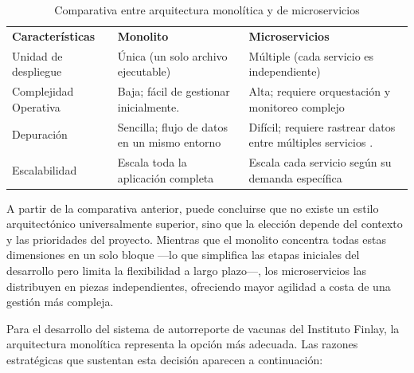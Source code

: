 \begin{table}[H]
	\centering
    \caption{Comparativa entre arquitectura monolítica y de microservicios}
	\label{tab:monolito_microservicios}
	
	\renewcommand{\arraystretch}{1.3}
	
	\begin{tabular}{p{3.2cm} p{4.3cm} p{4.3cm}}
		
		\textbf{Características} & \textbf{Monolito} & \textbf{Microservicios}\\[6pt]
		
		Unidad de despliegue &
	    Única (un solo archivo ejecutable) \cite{ibm_microservices_monolith} &
		Múltiple (cada servicio es independiente) \cite{aws_monolith_microservices} \\[6pt]
		\hline

		Complejidad Operativa &
        Baja; fácil de gestionar inicialmente. \cite{ibm_microservices_monolith} &
		Alta; requiere orquestación y monitoreo complejo \cite{aws_monolith_microservices}\\[6pt]
        \hline
		
		Depuración &
		Sencilla; flujo de datos en un mismo entorno \cite{ibm_microservices_monolith} &
		Difícil; requiere rastrear datos entre múltiples servicios \cite{aws_monolith_microservices}.  \\[6pt]
        \hline
		
		
	Escalabilidad
	& Escala toda la aplicación completa \cite{ibm_microservices_monolith}
	& Escala cada servicio según su demanda específica \cite{aws_monolith_microservices}
    
	\end{tabular}
\end{table}

A partir de la comparativa anterior, puede concluirse que no existe un estilo arquitectónico universalmente superior, sino que la elección depende del contexto y las prioridades del proyecto. 
Mientras que el monolito concentra todas estas dimensiones en un solo bloque —lo que simplifica las etapas iniciales del desarrollo pero limita la flexibilidad a largo plazo—, los microservicios las distribuyen en piezas independientes, ofreciendo mayor agilidad a costa de una gestión más compleja.

Para el desarrollo del sistema de autorreporte de vacunas del Instituto Finlay, la arquitectura monolítica representa la opción más adecuada.
Las razones estratégicas que sustentan esta decisión aparecen a continuación:

